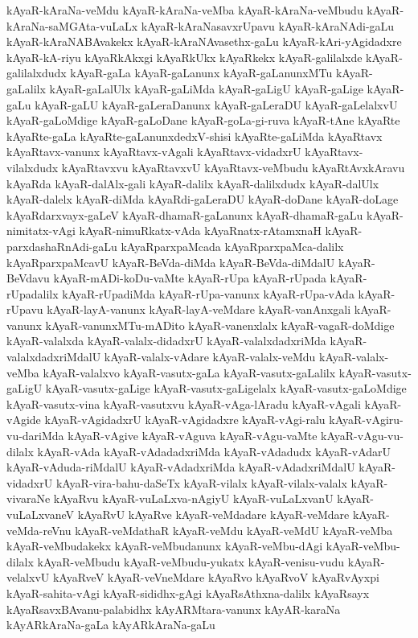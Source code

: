 {kAyaR-kAraNa-veMdu
kAyaR-kAraNa-veMba
kAyaR-kAraNa-veMbudu
kAyaR-kAraNa-saMGAta-vuLaLx
kAyaR-kAraNasavxrUpavu
kAyaR-kAraNAdi-gaLu
kAyaR-kAraNABAvakekx
kAyaR-kAraNAvasethx-gaLu
kAyaR-kAri-yAgidadxre
kAyaR-kA-riyu
kAyaRkAkxgi
kAyaRkUkx
kAyaRkekx
kAyaR-galilalxde
kAyaR-galilalxdudx
kAyaR-gaLa
kAyaR-gaLanunx
kAyaR-gaLanunxMTu
kAyaR-gaLalilx
kAyaR-gaLalUlx
kAyaR-gaLiMda
kAyaR-gaLigU
kAyaR-gaLige
kAyaR-gaLu
kAyaR-gaLU
kAyaR-gaLeraDanunx
kAyaR-gaLeraDU
kAyaR-gaLelalxvU
kAyaR-gaLoMdige
kAyaR-gaLoDane
kAyaR-goLa-gi-ruva
kAyaR-tAne
kAyaRte
kAyaRte-gaLa
kAyaRte-gaLanunxdedxV-shisi
kAyaRte-gaLiMda
kAyaRtavx
kAyaRtavx-vanunx
kAyaRtavx-vAgali
kAyaRtavx-vidadxrU
kAyaRtavx-vilalxdudx
kAyaRtavxvu
kAyaRtavxvU
kAyaRtavx-veMbudu
kAyaRtAvxkAravu
kAyaRda
kAyaR-dalAlx-gali
kAyaR-dalilx
kAyaR-dalilxdudx
kAyaR-dalUlx
kAyaR-dalelx
kAyaR-diMda
kAyaRdi-gaLeraDU
kAyaR-doDane
kAyaR-doLage
kAyaRdarxvayx-gaLeV
kAyaR-dhamaR-gaLanunx
kAyaR-dhamaR-gaLu
kAyaR-nimitatx-vAgi
kAyaR-nimuRkatx-vAda
kAyaRnatx-rAtamxnaH
kAyaR-parxdashaRnAdi-gaLu
kAyaRparxpaMcada
kAyaRparxpaMca-dalilx
kAyaRparxpaMcavU
kAyaR-BeVda-diMda
kAyaR-BeVda-diMdalU
kAyaR-BeVdavu
kAyaR-mADi-koDu-vaMte
kAyaR-rUpa
kAyaR-rUpada
kAyaR-rUpadalilx
kAyaR-rUpadiMda
kAyaR-rUpa-vanunx
kAyaR-rUpa-vAda
kAyaR-rUpavu
kAyaR-layA-vanunx
kAyaR-layA-veMdare
kAyaR-vanAnxgali
kAyaR-vanunx
kAyaR-vanunxMTu-mADito
kAyaR-vanenxlalx
kAyaR-vagaR-doMdige
kAyaR-valalxda
kAyaR-valalx-didadxrU
kAyaR-valalxdadxriMda
kAyaR-valalxdadxriMdalU
kAyaR-valalx-vAdare
kAyaR-valalx-veMdu
kAyaR-valalx-veMba
kAyaR-valalxvo
kAyaR-vasutx-gaLa
kAyaR-vasutx-gaLalilx
kAyaR-vasutx-gaLigU
kAyaR-vasutx-gaLige
kAyaR-vasutx-gaLigelalx
kAyaR-vasutx-gaLoMdige
kAyaR-vasutx-vina
kAyaR-vasutxvu
kAyaR-vAga-lAradu
kAyaR-vAgali
kAyaR-vAgide
kAyaR-vAgidadxrU
kAyaR-vAgidadxre
kAyaR-vAgi-ralu
kAyaR-vAgiru-vu-dariMda
kAyaR-vAgive
kAyaR-vAguva
kAyaR-vAgu-vaMte
kAyaR-vAgu-vu-dilalx
kAyaR-vAda
kAyaR-vAdadadxriMda
kAyaR-vAdadudx
kAyaR-vAdarU
kAyaR-vAduda-riMdalU
kAyaR-vAdadxriMda
kAyaR-vAdadxriMdalU
kAyaR-vidadxrU
kAyaR-vira-bahu-daSeTx
kAyaR-vilalx
kAyaR-vilalx-valalx
kAyaR-vivaraNe
kAyaRvu
kAyaR-vuLaLxva-nAgiyU
kAyaR-vuLaLxvanU
kAyaR-vuLaLxvaneV
kAyaRvU
kAyaRve
kAyaR-veMdadare
kAyaR-veMdare
kAyaR-veMda-reVnu
kAyaR-veMdathaR
kAyaR-veMdu
kAyaR-veMdU
kAyaR-veMba
kAyaR-veMbudakekx
kAyaR-veMbudanunx
kAyaR-veMbu-dAgi
kAyaR-veMbu-dilalx
kAyaR-veMbudu
kAyaR-veMbudu-yukatx
kAyaR-venisu-vudu
kAyaR-velalxvU
kAyaRveV
kAyaR-veVneMdare
kAyaRvo
kAyaRvoV
kAyaRvAyxpi
kAyaR-sahita-vAgi
kAyaR-sididhx-gAgi
kAyaRsAthxna-dalilx
kAyaRsayx
kAyaRsavxBAvanu-palabidhx
kAyARMtara-vanunx
kAyAR-karaNa
kAyARkAraNa-gaLa
kAyARkAraNa-gaLu
}
